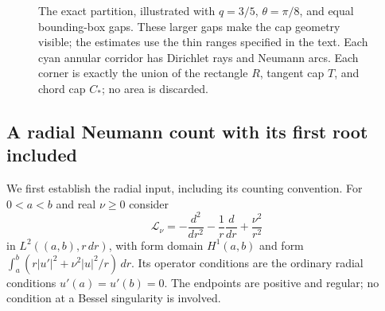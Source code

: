 \documentclass[11pt,reqno]{amsart}
\numberwithin{equation}{section}
\newcommand{\dd}{\,\mathrm d}
\begin{document}
\begin{figure}[tb]
\caption{The exact partition, illustrated with
$q=3/5$, $\theta=\pi/8$, and equal bounding-box gaps.  These larger
gaps make the cap geometry visible; the estimates use the thin ranges
specified in the text.  Each cyan annular corridor has Dirichlet rays
and Neumann arcs.  Each corner is exactly the union of the rectangle
$R$, tangent cap $T$, and chord cap $C_*$; no area is discarded.}
\label{geo:partition-figure}
\end{figure}
\subsection{A radial Neumann count with its first root included}
\label{geo:radial}

We first establish the radial input, including its counting convention.
For $0<a<b$ and real $\nu\ge0$ consider
\[
 \mathcal L_\nu=-\frac{d^2}{dr^2}-\frac1r\frac d{dr}
                       +\frac{\nu^2}{r^2}
\]
in $L^2((a,b),r\,dr)$, with form domain $H^1(a,b)$ and form
$\int_a^b(r|u'|^2+\nu^2|u|^2/r)\,dr$.  Its operator conditions are
the ordinary radial conditions $u'(a)=u'(b)=0$.  The endpoints are
positive and regular; no condition at a Bessel singularity is involved.
\end{document}
